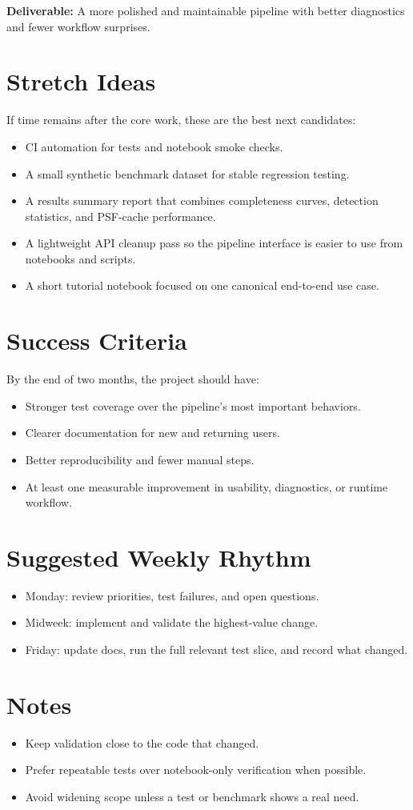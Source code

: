 \documentclass[11pt]{article}
\begin{document}
\noindent\textbf{Deliverable:} A more polished and maintainable pipeline with better diagnostics and fewer workflow surprises.

\section{Stretch Ideas}

If time remains after the core work, these are the best next candidates:

\begin{itemize}
    \item CI automation for tests and notebook smoke checks.
    \item A small synthetic benchmark dataset for stable regression testing.
    \item A results summary report that combines completeness curves, detection statistics, and PSF-cache performance.
    \item A lightweight API cleanup pass so the pipeline interface is easier to use from notebooks and scripts.
    \item A short tutorial notebook focused on one canonical end-to-end use case.
\end{itemize}

\section{Success Criteria}

By the end of two months, the project should have:

\begin{itemize}
    \item Stronger test coverage over the pipeline's most important behaviors.
    \item Clearer documentation for new and returning users.
    \item Better reproducibility and fewer manual steps.
    \item At least one measurable improvement in usability, diagnostics, or runtime workflow.
\end{itemize}

\section{Suggested Weekly Rhythm}

\begin{itemize}
    \item Monday: review priorities, test failures, and open questions.
    \item Midweek: implement and validate the highest-value change.
    \item Friday: update docs, run the full relevant test slice, and record what changed.
\end{itemize}

\section{Notes}

\begin{itemize}
    \item Keep validation close to the code that changed.
    \item Prefer repeatable tests over notebook-only verification when possible.
    \item Avoid widening scope unless a test or benchmark shows a real need.
\end{itemize}
\end{document}
